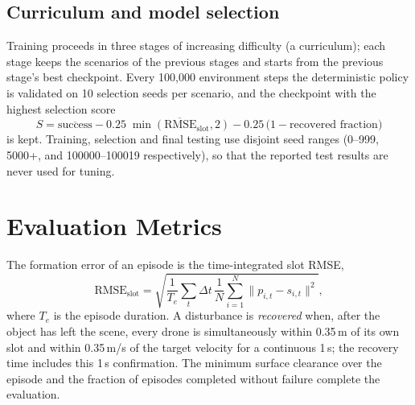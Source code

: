 \subsection{Curriculum and model selection}
Training proceeds in three stages of increasing difficulty (a curriculum); each stage keeps the
scenarios of the previous stages and starts from the previous stage's best checkpoint. Every 100{,}000
environment steps the deterministic policy is validated on 10 selection seeds per scenario, and the checkpoint
with the highest selection score
\begin{equation}
  S = \overline{\text{success}} - 0.25\;\overline{\min(\text{RMSE}_{\mathrm{slot}}, 2)} - 0.25\,\bigl(1 - \text{recovered fraction}\bigr)
  \label{eq:score}
\end{equation}
is kept. Training, selection and final testing use disjoint seed ranges (0--999, 5000+, and 100000--100019
respectively), so that the reported test results are never used for tuning.

\section{Evaluation Metrics}
The formation error of an episode is the time-integrated slot RMSE,
\begin{equation}
  \text{RMSE}_{\mathrm{slot}} = \sqrt{\frac{1}{T_e}\sum_{t}\Delta t\,\frac{1}{N}\sum_{i=1}^{N}\lVert p_{i,t} - s_{i,t}\rVert^2 },
  \label{eq:rmse}
\end{equation}
where $T_e$ is the episode duration. A disturbance is \emph{recovered} when, after the object has left the
scene, every drone is simultaneously within 0.35\,m of its own slot and within 0.35\,m/s of the target
velocity for a continuous 1\,s; the recovery time includes this 1\,s confirmation. The minimum surface
clearance over the episode and the fraction of episodes completed without failure complete the evaluation.
